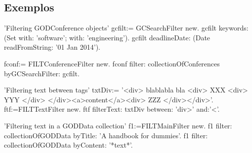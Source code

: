 \subsection{Exemplos}

\begin{godCode}

'Filtering GODConference objects'
gcfilt:= GCSearchFilter new.
gcfilt keywords: (Set with: 'software'; with: 'engineering').
gcfilt deadlineDate: (Date readFromString: '01 Jan 2014').

fconf:= FILTConferenceFilter new.
fconf filter: collectionOfConferences byGCSearchFilter: gcfilt.

'Filtering text between tags'
txtDiv:= '<div> blablabla bla <div> XXX <div> YYY </div> </div><a>content</a><div> ZZZ </div></div>'.
ftf:=FILTTextFilter new.
ftf filterText: txtDiv between: 'div>' and:'<'.

'Filtering text in a GODData collection'
f1:=FILTMainFilter new.
f1 filter: collectionOfGODData byTitle: 'A handbook for dummies'.
f1 filter: collectionOfGODData byContent: '*text*'.

\end{godCode}

